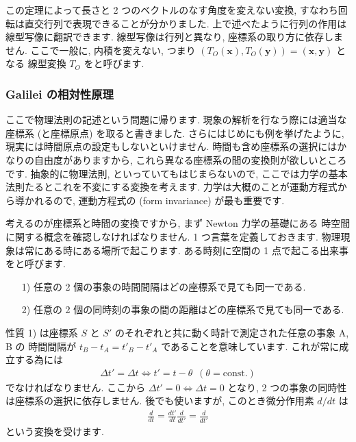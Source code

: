\documentclass[openany, a4paper, oneside]{jsbook}
\begin{document}
この定理によって長さと 2 つのベクトルのなす角度を変えない変換,
すなわち回転は直交行列で表現できることが分かりました.
上で述べたように行列の作用は線型写像に翻訳できます.
線型写像は行列と異なり, 座標系の取り方に依存しません.
ここで一般に, 内積を変えない, つまり
$( T_O ( \bm{x} ) , T_O ( \bm{y} ) ) = ( \bm{x} , \bm{y} )$ となる
線型変換  $T_O$  をと呼びます.
\subsubsection{Galilei の相対性原理}

ここで物理法則の記述という問題に帰ります.
現象の解析を行なう際には適当な座標系 (と座標原点) を取ると書きました.
さらにはじめにも例を挙げたように, 現実には時間原点の設定もしないといけません.
時間も含め座標系の選択にはかなりの自由度がありますから, これら異なる座標系の間の変換則が欲しいところです.
抽象的に物理法則, といっていてもはじまらないので,
ここでは力学の基本法則たるとこれを不変にする変換を考えます.
力学は大概のことが運動方程式から導かれるので, 運動方程式の
(form invariance) が最も重要です.

考えるのが座標系と時間の変換ですから, まず Newton 力学の基礎にある
時空間に関する概念を確認しなければなりません.
1 つ言葉を定義しておきます.
物理現象は常にある時にある場所で起こります.
ある時刻に空間の 1 点で起こる出来事をと呼びます.
\begin{enumerate}
    \item[1)] 任意の 2 個の事象の時間間隔はどの座標系で見ても同一である.
    \item[2)] 任意の 2 個の同時刻の事象の間の距離はどの座標系で見ても同一である.
\end{enumerate}
性質 1) は座標系 $S$ と $S'$ のそれぞれと共に動く時計で測定された任意の事象 A, B の
時間間隔が $t_B - t_A = t'_B - t'_A$ であることを意味しています.
これが常に成立する為には
\begin{gather}
    \varDelta t'
    =
    \varDelta t
    \Longleftrightarrow
    t'
    =
    t - \theta \,\,\, ( \theta = \mathrm{const.} )
\end{gather}
でなければなりません.
ここから $\varDelta t' = 0 \Leftrightarrow \varDelta t =0$ となり,
2 つの事象の同時性は座標系の選択に依存しません.
後でも使いますが, このとき微分作用素 $d/dt$ は
\begin{gather}
    \frac{d} {dt}
    =
    \frac{dt'} {dt} \frac{d} {dt'}
    =
    \frac{d} {dt'}
\end{gather}
という変換を受けます.
\end{document}
